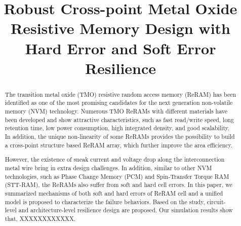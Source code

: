 \documentclass[conference, 9pt]{IEEEtran}
\begin{document}
\title{Robust Cross-point Metal Oxide Resistive Memory Design with Hard Error and Soft Error Resilience }
\maketitle

\begin{abstract}
The transition metal oxide (TMO) resistive random access memory (ReRAM) has been identified as one of the most promising candidates for the next generation non-volatile memory (NVM) technology. Numerous TMO ReRAMs with different materials have been developed and show attractive characteristics, such as fast read/write speed, long retention time, low power consumption, high integrated density, and good scalability. In addition, the unique non-linearity of some ReRAMs provides the possibility to build a cross-point structure based ReRAM array, which further improve the area efficiency.

However, the existence of sneak current and voltage drop along the interconnection metal wire bring in extra design challenges. In addition, similar to other NVM technologies, such as Phase Change Memory (PCM) and Spin-Transfer Torque RAM (STT-RAM), the ReRAMs also suffer from soft and hard cell errors. In this paper, we summarized mechanisms of both soft and hard errors of ReRAM cell and a unified model is proposed to characterize the failure behaviors.  Based on the study, circuit-level and architecture-level resilience design are proposed. Our simulation results show that, XXXXXXXXXXXX.
\end{abstract}












\end{document}
